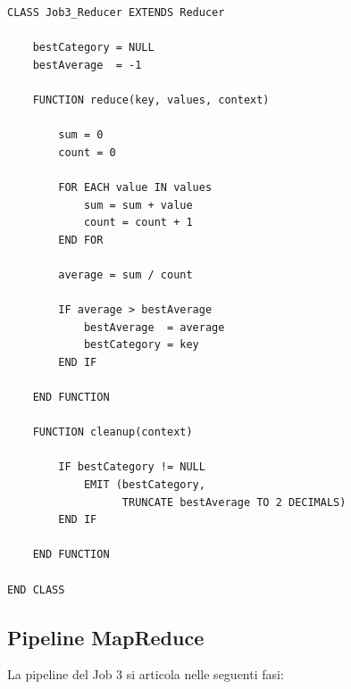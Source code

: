 \documentclass[12pt, a4paper]{article}
\begin{document}
\begin{verbatim}
CLASS Job3_Reducer EXTENDS Reducer

    bestCategory = NULL
    bestAverage  = -1

    FUNCTION reduce(key, values, context)

        sum = 0
        count = 0

        FOR EACH value IN values
            sum = sum + value
            count = count + 1
        END FOR

        average = sum / count

        IF average > bestAverage
            bestAverage  = average
            bestCategory = key
        END IF

    END FUNCTION

    FUNCTION cleanup(context)

        IF bestCategory != NULL
            EMIT (bestCategory,
                  TRUNCATE bestAverage TO 2 DECIMALS)
        END IF

    END FUNCTION

END CLASS
\end{verbatim}

\subsection{Pipeline MapReduce}

La pipeline del Job 3 si articola nelle seguenti fasi:
\end{document}
